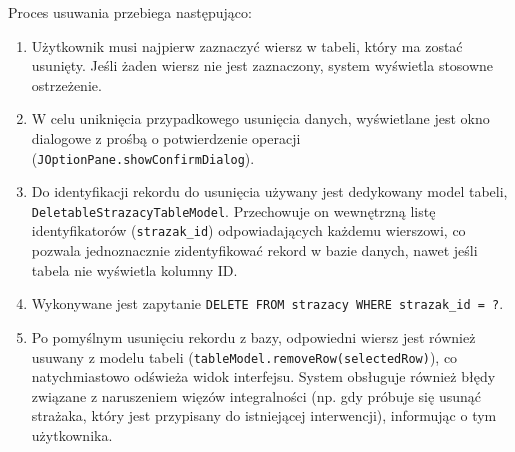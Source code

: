 Proces usuwania przebiega następująco:
\begin{enumerate}
    \item Użytkownik musi najpierw zaznaczyć wiersz w tabeli, który ma zostać usunięty. Jeśli żaden wiersz nie jest zaznaczony, system wyświetla stosowne ostrzeżenie.
    \item W celu uniknięcia przypadkowego usunięcia danych, wyświetlane jest okno dialogowe z prośbą o potwierdzenie operacji (\texttt{JOptionPane.showConfirmDialog}).
    \item Do identyfikacji rekordu do usunięcia używany jest dedykowany model tabeli, \texttt{DeletableStrazacyTableModel}. Przechowuje on wewnętrzną listę identyfikatorów (\texttt{strazak\_id}) odpowiadających każdemu wierszowi, co pozwala jednoznacznie zidentyfikować rekord w bazie danych, nawet jeśli tabela nie wyświetla kolumny ID.
    \item Wykonywane jest zapytanie \texttt{DELETE FROM strazacy WHERE strazak\_id = ?}.
    \item Po pomyślnym usunięciu rekordu z bazy, odpowiedni wiersz jest również usuwany z modelu tabeli (\texttt{tableModel.removeRow(selectedRow)}), co natychmiastowo odświeża widok interfejsu. System obsługuje również błędy związane z naruszeniem więzów integralności (np. gdy próbuje się usunąć strażaka, który jest przypisany do istniejącej interwencji), informując o tym użytkownika.
\end{enumerate}